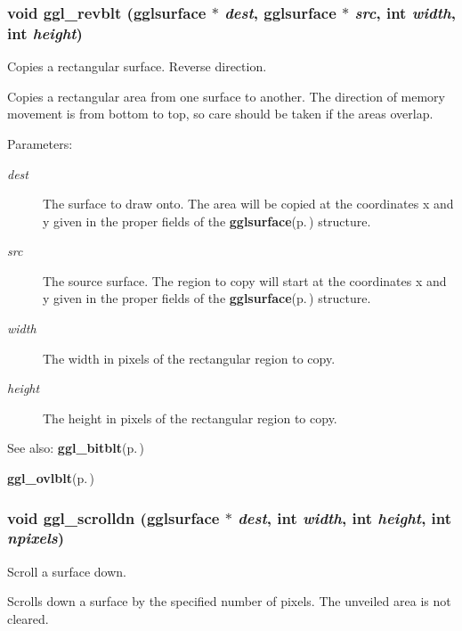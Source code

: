 \subsubsection{\setlength{\rightskip}{0pt plus 5cm}void ggl\_\-revblt ({\bf gglsurface} $\ast$ {\em dest}, {\bf gglsurface} $\ast$ {\em src}, int {\em width}, int {\em height})}\label{ggl_8h_a20}


Copies a rectangular surface. Reverse direction. 

Copies a rectangular area from one surface to another. The direction of memory movement is from bottom to top, so care should be taken if the areas overlap.

\begin{Desc}
\item[Parameters:]
\begin{description}
\item[{\em dest}]The surface to draw onto. The area will be copied at the coordinates x and y given in the proper fields of the {\bf gglsurface}{\rm (p.\,\pageref{structgglsurface})} structure. \item[{\em src}]The source surface. The region to copy will start at the coordinates x and y given in the proper fields of the {\bf gglsurface}{\rm (p.\,\pageref{structgglsurface})} structure. \item[{\em width}]The width in pixels of the rectangular region to copy. \item[{\em height}]The height in pixels of the rectangular region to copy.\end{description}
\end{Desc}
\begin{Desc}
\item[See also:]{\bf ggl\_\-bitblt}{\rm (p.\,\pageref{ggl_8h_a19})} 

{\bf ggl\_\-ovlblt}{\rm (p.\,\pageref{ggl_8h_a21})} \end{Desc}
\subsubsection{\setlength{\rightskip}{0pt plus 5cm}void ggl\_\-scrolldn ({\bf gglsurface} $\ast$ {\em dest}, int {\em width}, int {\em height}, int {\em npixels})}\label{ggl_8h_a23}


Scroll a surface down. 

Scrolls down a surface by the specified number of pixels. The unveiled area is not cleared.

